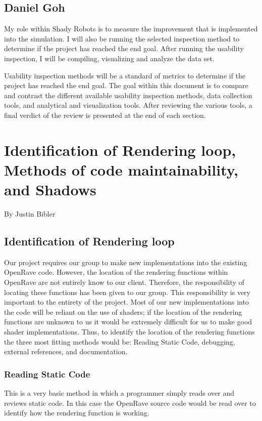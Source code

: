 \documentclass[10pt,journal,compsoc,draftclsnofoot]{IEEEtran}
\begin{document}
\subsection{Daniel Goh}
My role within Shady Robots is to measure the improvement that is implemented into the simulation.
I will also be running the selected inspection method to determine if the project has reached the end goal.
After running the usability inspection, I will be compiling, visualizing and analyze the data set.

Usability inspection methods will be a standard of metrics to determine if the project has reached the end goal.
The goal within this document is to compare and contrast the different available usability inspection methods, data collection tools, and analytical and visualization tools.
After reviewing the various tools, a final verdict of the review is presented at the end of each section.

\newpage

\section{Identification of Rendering loop, Methods of code maintainability, and Shadows}
\large{By Justin Bibler}

\normalsize
\subsection{Identification of Rendering loop}
Our project requires our group to make new implementations into the existing OpenRave code.
However, the location of the rendering functions within OpenRave are not entirely know to our client.
Therefore, the responsibility of locating these functions has been given to our group.
This responsibility is very important to the entirety of the project.
Most of our new implementations into the code will be reliant on the use of shaders;
 if the location of the rendering functions are unknown to us it would be extremely difficult for us to make good shader implementations.
Thus, to identify the location of the rendering functions the three most fitting methods would be: Reading Static Code, debugging, external references, and documentation.

\subsubsection{Reading Static Code}
This is a very basic method in which a programmer simply reads over and reviews static code.
In this case the OpenRave source code would be read over to identify how the rendering function is working.
\end{document}
